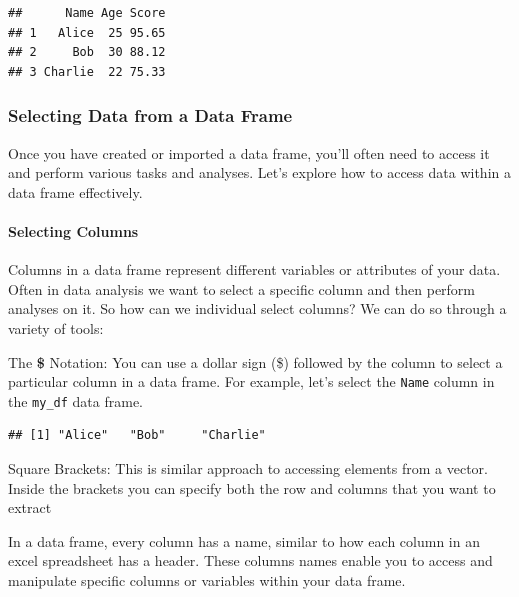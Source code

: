 \documentclass[
]{book}
\newenvironment{Shaded}{\begin{snugshade}}{\end{snugshade}}
\newcommand{\NormalTok}[1]{#1}
\newcommand{\SpecialCharTok}[1]{\textcolor[rgb]{0.81,0.36,0.00}{\textbf{#1}}}
\begin{document}
\begin{verbatim}
##      Name Age Score
## 1   Alice  25 95.65
## 2     Bob  30 88.12
## 3 Charlie  22 75.33
\end{verbatim}

\hypertarget{selecting-data-from-a-data-frame}{%
\subsubsection{Selecting Data from a Data Frame}\label{selecting-data-from-a-data-frame}}

Once you have created or imported a data frame, you'll often need to access it and perform various tasks and analyses. Let's explore how to access data within a data frame effectively.

\hypertarget{selecting-columns}{%
\paragraph{Selecting Columns}\label{selecting-columns}}

Columns in a data frame represent different variables or attributes of your data. Often in data analysis we want to select a specific column and then perform analyses on it. So how can we individual select columns? We can do so through a variety of tools:

The \textbf{\$} Notation: You can use a dollar sign (\$) followed by the column to select a particular column in a data frame. For example, let's select the \texttt{Name} column in the \texttt{my\_df} data frame.

\begin{Shaded}
\end{Shaded}

\begin{verbatim}
## [1] "Alice"   "Bob"     "Charlie"
\end{verbatim}

Square Brackets: This is similar approach to accessing elements from a vector. Inside the brackets you can specify both the row and columns that you want to extract

In a data frame, every column has a name, similar to how each column in an excel spreadsheet has a header. These columns names enable you to access and manipulate specific columns or variables within your data frame.
\end{document}
